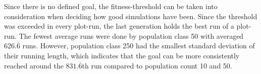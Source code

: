 			Since there is no defined goal, the fitness-threshold can be taken into consideration when deciding how good simulations have been. Since the threshold was exceeded in every plot-run, the last generation holds the best run of a plot-run. The fewest average runs were done by population class 50 with averaged $626.\overline{6}$ runs. However, population class 250 had the smallest standard deviation of their running length, which indicates that the goal can be more consistently reached around the $831.\overline{6}$th run compared to population count 10 and 50.
			
